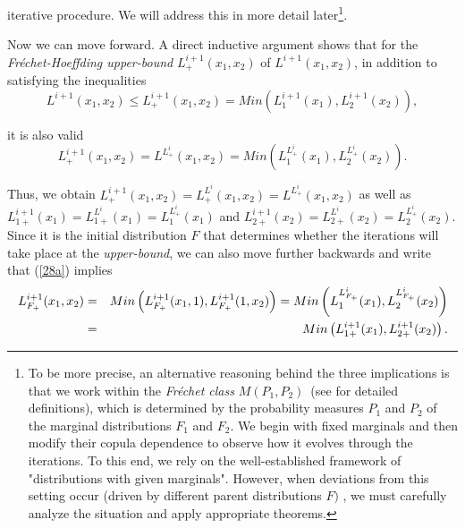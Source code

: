 \documentclass[onecolumn]{article}
\begin{document}
iterative procedure. We will address this in more detail later\footnote{%
{\footnotesize To be more precise, an alternative reasoning behind the three
implications is that we work within the \textit{Fr\'{e}chet class} }$%
M(P_{1},P_{2})${\footnotesize \ (see \cite{[5]} for detailed definitions),
which is determined by the probability measures }$P_{1}${\footnotesize {}
and }$P_{2}${\footnotesize {} of the marginal distributions }$F_{1}$%
{\footnotesize {} and }$F_{2}${\footnotesize {}. We begin with fixed
marginals and then modify their copula dependence to observe how it evolves
through the iterations. To this end, we rely on the well-established
framework of "distributions with given marginals". However, when deviations
from this setting occur (driven by different parent distributions }$F)$%
{\footnotesize , we must carefully analyze the situation and apply
appropriate theorems.}}.

Now we can move forward. A direct inductive argument shows that for the 
\textit{Fr\'{e}chet-Hoeffding upper-bound} $L_{+}^{i+1}(x_{1},x_{2})$ of $%
L^{i+1}(x_{1},x_{2})$, in addition to satisfying the inequalities 
\begin{equation}
L^{i+1}(x_{1},x_{2})\leq L_{+}^{i+1}(x_{1},x_{2})=Min\left(
L_{1}^{i+1}(x_{1}),L_{2}^{i+1}(x_{2})\right) ,  \label{28}
\end{equation}

it is also valid%
\begin{equation}
L_{+}^{i+1}(x_{1},x_{2})=L^{L_{+}^{i}}(x_{1},x_{2})=Min\left(
L_{1}^{L_{+}^{i}}(x_{1}),L_{2}^{L_{+}^{i}}(x_{2})\right) .  \label{28a}
\end{equation}

Thus, we obtain $%
L_{+}^{i+1}(x_{1},x_{2})=L_{+}^{L^{i}}(x_{1},x_{2})=L^{L_{+}^{i}}(x_{1},x_{2}) 
$ as well as $%
L_{1+}^{i+1}(x_{1})=L_{1+}^{L^{i}}(x_{1})=L_{1}^{L_{+}^{i}}(x_{1})$ and $%
L_{2+}^{i+1}(x_{2})=L_{2+}^{L^{i}}(x_{2})=L_{2}^{L_{+}^{i}}(x_{2})$. Since
it is the initial distribution $F$ that determines whether the iterations
will take place at the \textit{upper-bound}, we can also move further
backwards and write that (\ref{28a}) implies%
\begin{eqnarray}
L_{F_{+}}^{i+1}(x_{1},x_{2}) &=&Min\left(
L_{F_{+}}^{i+1}(x_{1},1),L_{F_{+}}^{i+1}(1,x_{2})\right) =Min\left(
L_{1}^{L_{F_{+}}^{i}}(x_{1}),L_{2}^{L_{F_{+}}^{i}}(x_{2})\right)  \label{28b}
\\
&=&Min\left( L_{1+}^{i+1}(x_{1}),L_{2+}^{i+1}(x_{2})\right) .  \notag
\end{eqnarray}
\end{document}
